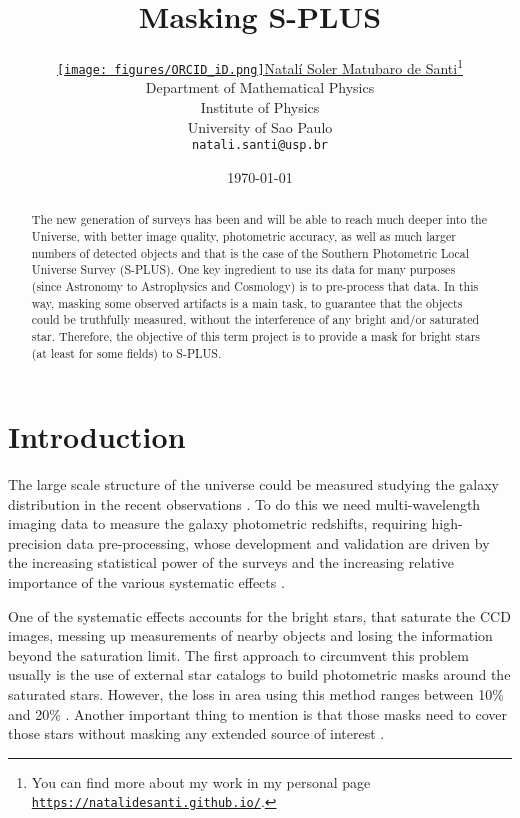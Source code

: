 \documentclass{article}
\title{\bf Masking S-PLUS}
\date{\today}	%
\author{ \href{ https://orcid.org/0000-0002-4728-6881}{\texttt{[image: figures/ORCID\_iD.png]}\hspace{1mm}Natalí Soler Matubaro de Santi}\thanks{You can find more about my work in my personal page \href{https://natalidesanti.github.io/}{\texttt{https://natalidesanti.github.io/}}.} \\
	Department of Mathematical Physics\\
        Institute of Physics\\
	University of Sao Paulo\\
	\texttt{natali.santi@usp.br} \\
}
\begin{document}
\maketitle

\begin{abstract}
  The new generation of surveys has been and will be able to reach much deeper into the Universe, with better image quality, photometric accuracy, as well as much larger numbers of detected objects and that is the case of the Southern Photometric Local Universe Survey (S-PLUS). One key ingredient to use its data for many purposes (since Astronomy to Astrophysics and Cosmology) is to pre-process that data. In this way, masking some observed artifacts is a main task, to guarantee that the objects could be truthfully measured, without the interference of any bright and/or saturated star. Therefore, the objective of this term project is to provide a mask for bright stars (at least for some fields) to S-PLUS.
\end{abstract}



\section{Introduction}

The large scale structure of the universe could be measured studying the galaxy distribution in the recent observations \cite{DES2005, LSST2008, Euclid2012, PFS2012, DESI2016, SPLUS2019}. To do this we need multi-wavelength imaging data to measure the galaxy photometric redshifts, requiring high-precision data pre-processing, whose development and validation are driven by the increasing statistical power of the surveys and the increasing relative importance of the various systematic effects \cite{Coupon2017}.

One of the systematic effects accounts for the bright stars, that saturate the CCD images, messing up measurements of nearby objects and losing the information beyond the saturation limit. The first approach to circumvent this problem usually is the use of external star catalogs to build photometric masks around the saturated stars. However, the loss in area using this method ranges between 10\% and 20\% \cite{Coupon2009, Heymans2012}. Another important thing to mention is that those masks need to cover those stars without masking any extended source of interest \cite{Coupon2017}.
\end{document}
